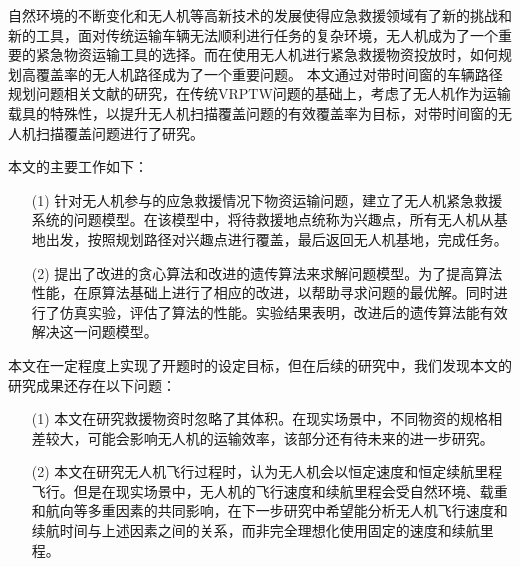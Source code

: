 
\begin{conclusions}
自然环境的不断变化和无人机等高新技术的发展使得应急救援领域有了新的挑战和新的工具，面对传统运输车辆无法顺利进行任务的复杂环境，无人机成为了一个重要的紧急物资运输工具的选择。而在使用无人机进行紧急救援物资投放时，如何规划高覆盖率的无人机路径成为了一个重要问题。
本文通过对带时间窗的车辆路径规划问题相关文献的研究，在传统VRPTW问题的基础上，考虑了无人机作为运输载具的特殊性，以提升无人机扫描覆盖问题的有效覆盖率为目标，对带时间窗的无人机扫描覆盖问题进行了研究。


本文的主要工作如下：
\begin{itemize}
	\item [(1)] 针对无人机参与的应急救援情况下物资运输问题，建立了无人机紧急救援系统的问题模型。在该模型中，将待救援地点统称为兴趣点，所有无人机从基地出发，按照规划路径对兴趣点进行覆盖，最后返回无人机基地，完成任务。
 	\item [(2)] 提出了改进的贪心算法和改进的遗传算法来求解问题模型。为了提高算法性能，在原算法基础上进行了相应的改进，以帮助寻求问题的最优解。同时进行了仿真实验，评估了算法的性能。实验结果表明，改进后的遗传算法能有效解决这一问题模型。
\end{itemize}


本文在一定程度上实现了开题时的设定目标，但在后续的研究中，我们发现本文的研究成果还存在以下问题：
\begin{itemize}
	\item [(1)] 本文在研究救援物资时忽略了其体积。在现实场景中，不同物资的规格相差较大，可能会影响无人机的运输效率，该部分还有待未来的进一步研究。
 	\item [(2)] 本文在研究无人机飞行过程时，认为无人机会以恒定速度和恒定续航里程飞行。但是在现实场景中，无人机的飞行速度和续航里程会受自然环境、载重和航向等多重因素的共同影响，在下一步研究中希望能分析无人机飞行速度和续航时间与上述因素之间的关系，而非完全理想化使用固定的速度和续航里程。
\end{itemize}

\end{conclusions}